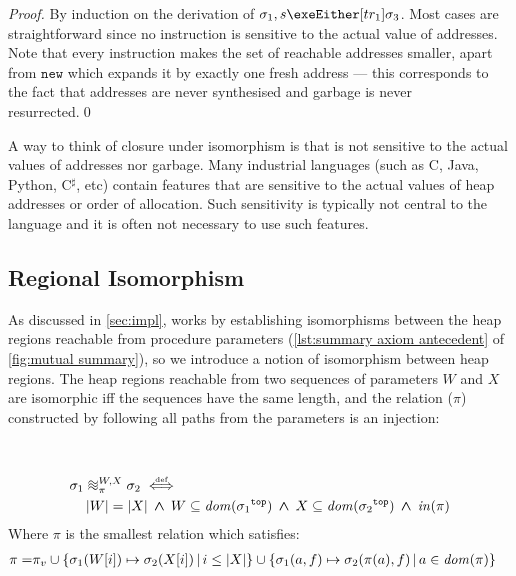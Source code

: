 \documentclass[runningheads,a4paper]{llncs}
\DeclareMathOperator{\band}{\bm{\;\land\;}}
\newcommand*{\domain}[1]{\mathit{dom}(#1)}
\newcommand*{\cardinality}[1]{\left|{#1}\right|}
\newcommand*{\defiff}{\stackrel{\text{\tiny def}}{\iff}}
\newcommand*{\setcomp}[2]{\left\{#1\,\middle|\,#2\right\}}
\newcommand*{\news}{\texttt{new}}
\newcommand{\tr}{tr}
\newcommand*{\bijection}[1]{\mathit{in}{\left(#1\right)}}
\newcommand*{\wiso}{%
  \mathrel{\vcenter{\offinterlineskip
  \hbox{$\sim$}\vskip-.35ex\hbox{$\sim$}\vskip-.35ex\hbox{$\sim$}}}}
\newcommand*{\store}{\sigma}
\newcommand*{\topof}[1]{{#1}^{\mathtt{top}}}
\newcommand{\ncui}{closure under isomorphism}
\begin{document}
\begin{proof}By induction on the derivation of $\store_1,s\exeEither[\tr_1]\store_3$. Most cases are straightforward since no instruction is sensitive to the actual value of addresses. Note that every instruction makes the set of reachable addresses smaller, apart from $\news$ which expands it by exactly one fresh address --- this corresponds to the fact that addresses are never synthesised and garbage is never resurrected.\qed\end{proof}

A way to think of \ncui{} is that \lang{} is not sensitive to the actual values of addresses nor garbage. Many industrial languages (such as C, Java, Python, C$^\sharp$, etc) contain features that are sensitive to the actual values of heap addresses or order of allocation. Such sensitivity is typically not central to the language and it is often not necessary to use such features. 

\subsection{Regional Isomorphism}

As discussed in \cref{sec:impl}, \Tool{} works by establishing isomorphisms between the heap regions reachable from procedure parameters (\cref{lst:summary axiom antecedent} of \cref{fig:mutual summary}), so we introduce a notion of isomorphism between heap regions. The heap regions reachable from two sequences of parameters $W$ and $X$ are isomorphic iff the sequences have the same length, and the relation ($\pi$) constructed by following all paths from the parameters is an injection: 

\begin{definition}\label{def:regional isomorphism}\setlength{\parindent}{0cm}~

\[\begin{aligned}
&	\store_1\wiso_{\pi}^{W,X}\store_2 \defiff \\
&\quad	\cardinality{W} = \cardinality{X} \band W \subseteq \domain{\topof{\store_1}} \band X \subseteq \domain{\topof{\store_2}} \band \bijection{\pi}
\end{aligned}\]
	Where $\pi$ is the smallest relation which satisfies:
		\[\begin{aligned}
		   \pi = &\piv \cup
		   \setcomp{\store_1(W[i])\mapsto\store_2(X[i])}{i \le \cardinality{X}} \cup
		   \setcomp{\store_1(a,f)\mapsto\store_2(\pi(a),f)}{a \in \domain{\pi}}
		\end{aligned}\]
\end{definition}
\end{document}
